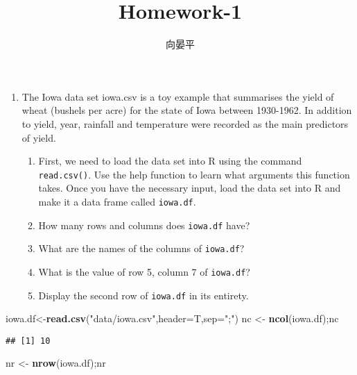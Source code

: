 \documentclass[hyperref,]{ctexart}
\title{Homework-1}
\author{向晏平}
\date{}
\newenvironment{Shaded}{\begin{snugshade}}{\end{snugshade}}
\newcommand{\DataTypeTok}[1]{\textcolor[rgb]{0.13,0.29,0.53}{#1}}
\newcommand{\KeywordTok}[1]{\textcolor[rgb]{0.13,0.29,0.53}{\textbf{#1}}}
\newcommand{\NormalTok}[1]{#1}
\newcommand{\StringTok}[1]{\textcolor[rgb]{0.31,0.60,0.02}{#1}}
\providecommand{\tightlist}{%
  \setlength{\itemsep}{0pt}\setlength{\parskip}{0pt}}
\begin{document}
\maketitle

\begin{enumerate}
\def\labelenumi{\arabic{enumi}.}
\tightlist
\item
  The Iowa data set iowa.csv is a toy example that summarises the yield
  of wheat (bushels per acre) for the state of Iowa between 1930-1962.
  In addition to yield, year, rainfall and temperature were recorded as
  the main predictors of yield.

  \begin{enumerate}
  \def\labelenumii{\alph{enumii}.}
  \tightlist
  \item
    First, we need to load the data set into R using the command
    \texttt{read.csv()}. Use the help function to learn what arguments
    this function takes. Once you have the necessary input, load the
    data set into R and make it a data frame called \texttt{iowa.df}.
  \item
    How many rows and columns does \texttt{iowa.df} have?
  \item
    What are the names of the columns of \texttt{iowa.df}?
  \item
    What is the value of row 5, column 7 of \texttt{iowa.df}?
  \item
    Display the second row of \texttt{iowa.df} in its entirety.
  \end{enumerate}
\end{enumerate}

\begin{Shaded}
\begin{Highlighting}[]
\NormalTok{iowa.df<-}\KeywordTok{read.csv}\NormalTok{(}\StringTok{"data/iowa.csv"}\NormalTok{,}\DataTypeTok{header=}\NormalTok{T,}\DataTypeTok{sep=}\StringTok{";"}\NormalTok{)}
\NormalTok{nc <-}\StringTok{ }\KeywordTok{ncol}\NormalTok{(iowa.df);nc}
\end{Highlighting}
\end{Shaded}

\begin{verbatim}
## [1] 10
\end{verbatim}

\begin{Shaded}
\begin{Highlighting}[]
\NormalTok{nr <-}\StringTok{ }\KeywordTok{nrow}\NormalTok{(iowa.df);nr}
\end{Highlighting}
\end{Shaded}
\end{document}
